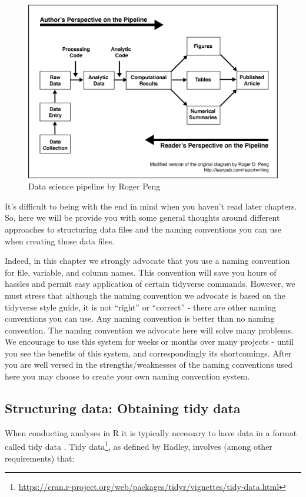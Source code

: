 \documentclass[
]{krantz}
\renewcommand{\href}[2]{#2\footnote{\url{#1}}}
\begin{document}
\begin{figure}
\includegraphics[width=0.85\linewidth]{ch_enter_load/images/pipeline} \caption{Data science pipeline by Roger Peng}\label{fig:pipeline}
\end{figure}

It's difficult to being with the end in mind when you haven't read later chapters. So, here we will be provide you with some general thoughts around different approaches to structuring data files and the naming conventions you can use when creating those data files.

Indeed, in this chapter we strongly advocate that you use a naming convention for file, variable, and column names. This convention will save you hours of hassles and permit easy application of certain tidyverse commands. However, we must stress that although the naming convention we advocate is based on the tidyverse style guide, it is not ``right'' or ``correct'' - there are other naming conventions you can use. Any naming convention is better than no naming convention. The naming convention we advocate here will solve many problems. We encourage to use this system for weeks or months over many projects - until you see the benefits of this system, and correspondingly its shortcomings. After you are well versed in the strengths/weaknesses of the naming conventions used here you may choose to create your own naming convention system.

\hypertarget{structuring-data-obtaining-tidy-data}{%
\subsection{Structuring data: Obtaining tidy data}\label{structuring-data-obtaining-tidy-data}}

When conducting analyses in R it is typically necessary to have data in a format called tidy data \citep{tidy-data}. \href{https://cran.r-project.org/web/packages/tidyr/vignettes/tidy-data.html}{Tidy data}, as defined by Hadley, involves (among other requirements) that:
\end{document}

